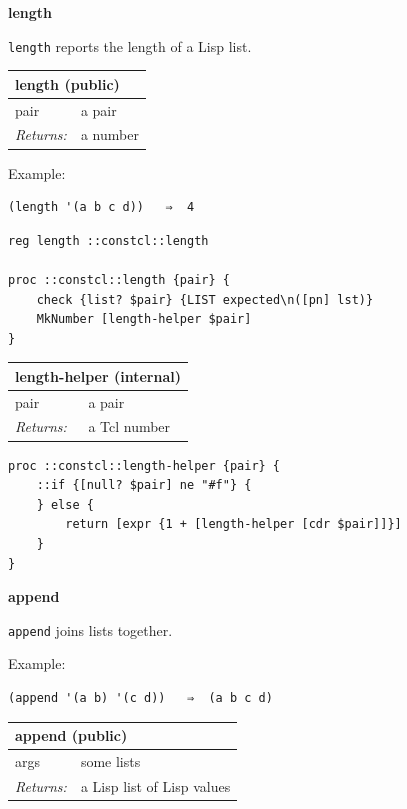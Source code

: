 \documentclass[twoside,9pt]{report}
\begin{document}
\textbf{length}


\texttt{length} reports the length of a Lisp list.

\begin{tabular}{ |l l| }
\hline
\multicolumn{2}{|l|}{length (public)} \\
\hline
pair & a pair \\
\textit{Returns:} & a number \\
\hline
\end{tabular}


Example:

\noindent\makebox[\linewidth]{\rule{\linewidth}{0.4pt}}
\begin{lstlisting}
(length '(a b c d))   ⇒  4
\end{lstlisting}
\noindent\makebox[\linewidth]{\rule{\linewidth}{0.4pt}}
\noindent\makebox[\linewidth]{\rule{\linewidth}{0.4pt}}
\begin{lstlisting}
reg length ::constcl::length
 
proc ::constcl::length {pair} {
    check {list? $pair} {LIST expected\n([pn] lst)}
    MkNumber [length-helper $pair]
}
\end{lstlisting}
\noindent\makebox[\linewidth]{\rule{\linewidth}{0.4pt}}
\begin{tabular}{ |l l| }
\hline
\multicolumn{2}{|l|}{length-helper (internal)} \\
\hline
pair & a pair \\
\textit{Returns:} & a Tcl number \\
\hline
\end{tabular}

\noindent\makebox[\linewidth]{\rule{\linewidth}{0.4pt}}
\begin{lstlisting}
proc ::constcl::length-helper {pair} {
    ::if {[null? $pair] ne "#f"} {
    } else {
        return [expr {1 + [length-helper [cdr $pair]]}]
    }
}
\end{lstlisting}
\noindent\makebox[\linewidth]{\rule{\linewidth}{0.4pt}}

\textbf{append}


\texttt{append} joins lists together.


Example:

\noindent\makebox[\linewidth]{\rule{\linewidth}{0.4pt}}
\begin{lstlisting}
(append '(a b) '(c d))   ⇒  (a b c d)
\end{lstlisting}
\noindent\makebox[\linewidth]{\rule{\linewidth}{0.4pt}}
\begin{tabular}{ |l l| }
\hline
\multicolumn{2}{|l|}{append (public)} \\
\hline
args & some lists \\
\textit{Returns:} & a Lisp list of Lisp values \\
\hline
\end{tabular}
\end{document}
